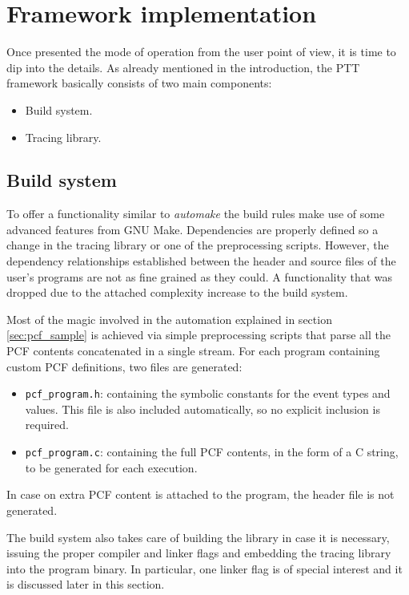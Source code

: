 \section{Framework implementation}
\label{sec:framework}

Once presented the mode of operation from the user point of view, it is time to
dip into the details.  As already mentioned in the introduction, the PTT
framework basically consists of two main components:

\begin{itemize}
\item Build system.
\item Tracing library.
\end{itemize}


\subsection{Build system}

To offer a functionality similar to \emph{automake} the build rules make use of
some advanced features from GNU Make.  Dependencies are properly defined so a
change in the tracing library or one of the preprocessing scripts.  However, the
dependency relationships established between the header and source files of the
user's programs are not as fine grained as they could.  A functionality that was
dropped due to the attached complexity increase to the build system.

Most of the magic involved in the automation explained in section
\ref{sec:pcf_sample} is achieved via simple preprocessing scripts that parse all
the PCF contents concatenated in a single stream.  For each program containing
custom PCF definitions, two files are generated:

\begin{itemize}
\item \verb:pcf_program.h:: containing the symbolic constants for the event
types and values.  This file is also included automatically, so no explicit
inclusion is required.
\item \verb:pcf_program.c:: containing the full PCF contents, in the form of a C
string, to be generated for each execution.
\end{itemize}

In case on extra PCF content is attached to the program, the header file is
not generated.

The build system also takes care of building the library in case it is
necessary, issuing the proper compiler and linker flags and embedding the
tracing library into the program binary.  In particular, one linker flag is of
special interest and it is discussed later in this section.


